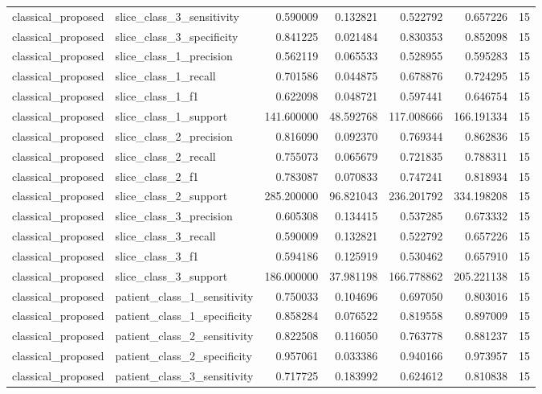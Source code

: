 \begin{tabular}{llrrrrr}
classical_proposed & slice_class_3_sensitivity & 0.590009 & 0.132821 & 0.522792 & 0.657226 & 15 \\
classical_proposed & slice_class_3_specificity & 0.841225 & 0.021484 & 0.830353 & 0.852098 & 15 \\
classical_proposed & slice_class_1_precision & 0.562119 & 0.065533 & 0.528955 & 0.595283 & 15 \\
classical_proposed & slice_class_1_recall & 0.701586 & 0.044875 & 0.678876 & 0.724295 & 15 \\
classical_proposed & slice_class_1_f1 & 0.622098 & 0.048721 & 0.597441 & 0.646754 & 15 \\
classical_proposed & slice_class_1_support & 141.600000 & 48.592768 & 117.008666 & 166.191334 & 15 \\
classical_proposed & slice_class_2_precision & 0.816090 & 0.092370 & 0.769344 & 0.862836 & 15 \\
classical_proposed & slice_class_2_recall & 0.755073 & 0.065679 & 0.721835 & 0.788311 & 15 \\
classical_proposed & slice_class_2_f1 & 0.783087 & 0.070833 & 0.747241 & 0.818934 & 15 \\
classical_proposed & slice_class_2_support & 285.200000 & 96.821043 & 236.201792 & 334.198208 & 15 \\
classical_proposed & slice_class_3_precision & 0.605308 & 0.134415 & 0.537285 & 0.673332 & 15 \\
classical_proposed & slice_class_3_recall & 0.590009 & 0.132821 & 0.522792 & 0.657226 & 15 \\
classical_proposed & slice_class_3_f1 & 0.594186 & 0.125919 & 0.530462 & 0.657910 & 15 \\
classical_proposed & slice_class_3_support & 186.000000 & 37.981198 & 166.778862 & 205.221138 & 15 \\
classical_proposed & patient_class_1_sensitivity & 0.750033 & 0.104696 & 0.697050 & 0.803016 & 15 \\
classical_proposed & patient_class_1_specificity & 0.858284 & 0.076522 & 0.819558 & 0.897009 & 15 \\
classical_proposed & patient_class_2_sensitivity & 0.822508 & 0.116050 & 0.763778 & 0.881237 & 15 \\
classical_proposed & patient_class_2_specificity & 0.957061 & 0.033386 & 0.940166 & 0.973957 & 15 \\
classical_proposed & patient_class_3_sensitivity & 0.717725 & 0.183992 & 0.624612 & 0.810838 & 15 \\

\end{tabular}
